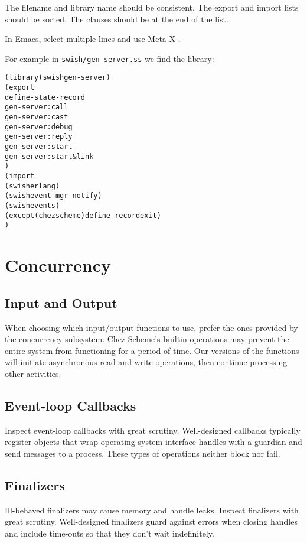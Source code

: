 \documentclass[letterpaper,11pt,twoside,final]{article}
\begin{document}
The filename and library name should be consistent. The export and
import lists should be sorted. The  clauses should be
at the end of the  list.

In Emacs, select multiple lines and use Meta-X .

For example in \texttt{swish/gen-server.ss} we find the
 library: \antipar
\begin{alltt}
(library (swish gen-server)
  (export
   define-state-record
   gen-server:call
   gen-server:cast
   gen-server:debug
   gen-server:reply
   gen-server:start
   gen-server:start&link
   )
  (import
   (swish erlang)
   (swish event-mgr-notify)
   (swish events)
   (except (chezscheme) define-record exit)
   )
\end{alltt}

\section* {Concurrency}

\subsection* {Input and Output}

When choosing which input/output functions to use, prefer the ones
provided by the concurrency subsystem. Chez Scheme's builtin
operations may prevent the entire system from functioning for a period
of time. Our versions of the functions will initiate asynchronous read
and write operations, then continue processing other activities.

\subsection* {Event-loop Callbacks}

Inspect event-loop callbacks with great scrutiny. Well-designed
callbacks typically register objects that wrap operating system
interface handles with a guardian and send messages to a
process. These types of operations neither block nor fail.

\subsection* {Finalizers}

Ill-behaved finalizers may cause memory and handle leaks. Inspect
finalizers with great scrutiny. Well-designed finalizers guard against
errors when closing handles and include time-outs so that they don't
wait indefinitely.
\end{document}
